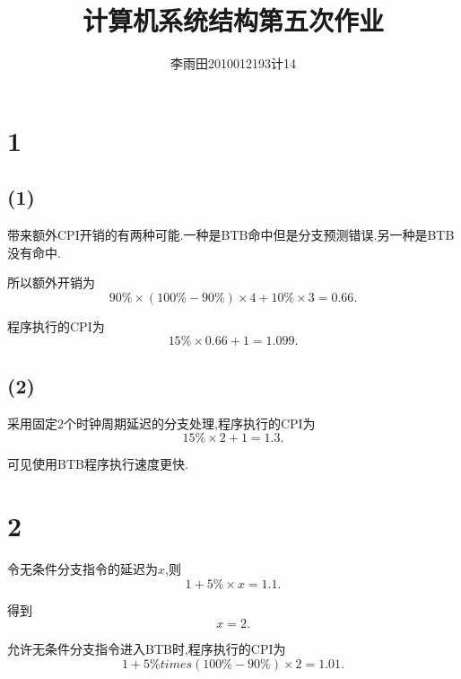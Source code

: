 \documentclass[adobefonts, nocap]{ctexart}
\begin{document}
  \title{计算机系统结构第五次作业}
  \author{李雨田\hspace{1em}2010012193\hspace{1em}计14}
  \maketitle
  \section*{1}
    \subsection*{(1)}
      带来额外CPI开销的有两种可能.一种是BTB命中但是分支预测错误.另一种是BTB没有命中.

      所以额外开销为
      \[
        90\%\times\left(100\%-90\%\right)\times 4+10\%\times 3=0.66.
      \]

      程序执行的CPI为
      \[
        15\%\times 0.66+1=1.099.
      \]
    \subsection*{(2)}
      采用固定$2$个时钟周期延迟的分支处理,程序执行的CPI为
      \[
        15\%\times 2+1=1.3.
      \]

      可见使用BTB程序执行速度更快.
  \section*{2}
    令无条件分支指令的延迟为$x$,则
    \[
      1+5\%\times x=1.1.
    \]

    得到
    \[
      x=2.
    \]

    允许无条件分支指令进入BTB时,程序执行的CPI为
    \[
      1+5\%times\left(100\%-90\%\right)\times 2=1.01.
    \]
\end{document}
